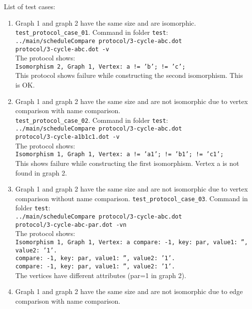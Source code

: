 \documentclass[12pt,a4paper]{report}
\begin{document}
List of test cases:
\begin{enumerate}
  \item Graph 1 and graph 2 have the same size and are isomorphic. \\
    \texttt{test\_protocol\_case\_01}. Command in folder \texttt{test}: \\
    \texttt{../main/scheduleCompare protocol/3-cycle-abc.dot \\ protocol/3-cycle-abc.dot -v} \\
    The protocol shows: \\
    \texttt{Isomorphism 2, Graph 1, Vertex: a != 'b'; != 'c';} \\
    This protocol shows failure while constructing the second isomorphism. This is OK.
  \item Graph 1 and graph 2 have the same size and are not isomorphic due to vertex comparison with name comparison. \\
    \texttt{test\_protocol\_case\_02}. Command in folder \texttt{test}: \\
    \texttt{../main/scheduleCompare protocol/3-cycle-abc.dot \\ protocol/3-cycle-a1b1c1.dot -v} \\
    The protocol shows: \\
    \texttt{Isomorphism 1, Graph 1, Vertex: a != 'a1'; != 'b1'; != 'c1';} \\
    This shows failure while constructing the first isomorphism. Vertex a is not found in graph 2.
  \item Graph 1 and graph 2 have the same size and are not isomorphic due to vertex comparison without name comparison.
    \texttt{test\_protocol\_case\_03}. Command in folder \texttt{test}: \\
    \texttt{../main/scheduleCompare protocol/3-cycle-abc.dot \\ protocol/3-cycle-abc-par.dot -vn} \\
    The protocol shows: \\
    \texttt{Isomorphism 1, Graph 1, Vertex: a compare: -1, key: par, value1: '', value2: '1'. \\
    compare: -1, key: par, value1: '', value2: '1'. \\
    compare: -1, key: par, value1: '', value2: '1'.} \\
    The vertices have different attributes (par=1 in graph 2).
  \item Graph 1 and graph 2 have the same size and are not isomorphic due to edge comparison with name comparison.

\end{enumerate}
\end{document}
